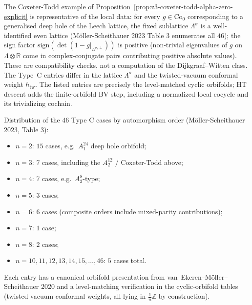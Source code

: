 \begin{remark}
\label{rem:schellekens-typeC-universal-mechanism}
The Coxeter-Todd example of
Proposition~\ref{prop:z3-coxeter-todd-alpha-zero-explicit} is
representative of the local data: for every
$g \in \mathrm{Co}_0$ corresponding to a
generalised deep hole of the Leech lattice, the fixed sublattice
$\Lambda^\sigma$ is a well-identified even lattice (M\"oller-Scheithauer
2023 Table 3 enumerates all $46$); the sign factor
$\mathrm{sign}(\det(1 - g|_{\Lambda^{\sigma,\perp}}))$ is positive
(non-trivial eigenvalues of $g$ on $\Lambda \otimes \mathbb{R}$
come in complex-conjugate pairs contributing positive absolute
values).  These are compatibility checks, not a computation of
the Dijkgraaf--Witten class.  The Type~C entries differ in the lattice
$\Lambda^\sigma$ and the twisted-vacuum conformal weight
$h_{\mathrm{tw}}$. The listed entries are precisely the
level-matched cyclic orbifolds; HT descent adds the finite-orbifold BV
step, including a normalized local cocycle and its trivializing
cochain.
\end{remark}

\begin{remark}
\label{rem:schellekens-typeC-enumeration}
Distribution of the $46$ Type C cases by automorphism order
(M\"oller-Scheithauer 2023, Table 3):
\begin{itemize}
\item $n = 2$: $15$ cases, e.g.\ $A_1^{24}$ deep hole orbifold;
\item $n = 3$: $7$ cases, including the $A_2^{12}$ / Coxeter-Todd
above;
\item $n = 4$: $7$ cases, e.g.\ $A_3^8$-type;
\item $n = 5$: $3$ cases;
\item $n = 6$: $6$ cases (composite orders include mixed-parity
contributions);
\item $n = 7$: $1$ case;
\item $n = 8$: $2$ cases;
\item $n = 10, 11, 12, 13, 14, 15, \ldots, 46$: $5$ cases total.
\end{itemize}
Each entry has a canonical orbifold presentation from
van~Ekeren--M\"oller--Scheithauer 2020 and a level-matching
verification in the cyclic-orbifold tables (twisted vacuum conformal weights, all lying in
$\frac{1}{n}\mathbb{Z}$ by construction).
\end{remark}


